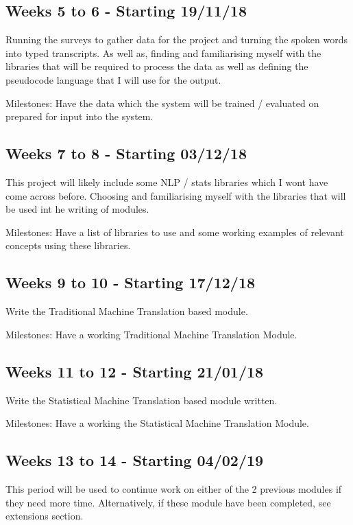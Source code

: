 \documentclass[12pt]{article}
\begin{document}
\subsection*{Weeks 5 to 6 - Starting 19/11/18}

Running the surveys to gather data for the project and turning the spoken words into typed
transcripts. As well as, finding and familiarising myself with the libraries that will be required to
process the data as well as defining the pseudocode language that I will use for the output. 

Milestones: Have the data which the system will be trained / evaluated on prepared for input into the system.

\subsection*{Weeks 7 to 8 - Starting 03/12/18}

This project will likely include some NLP / stats libraries which I wont have come across before. 
Choosing and familiarising myself with the libraries that will be used int he writing of modules.

Milestones: Have a list of libraries to use and some working examples of relevant concepts using these libraries.

\subsection*{Weeks 9 to 10 - Starting 17/12/18}

Write the Traditional Machine Translation based module.

Milestones: Have a working Traditional Machine Translation Module.

\subsection*{Weeks 11 to 12 - Starting 21/01/18}

Write the Statistical Machine Translation based module written.

Milestones: Have a working the Statistical Machine Translation Module.

\subsection*{Weeks 13 to 14 - Starting 04/02/19}

This period will be used to continue work on either of the 2 previous modules if they need more
time. Alternatively, if these module have been completed, see extensions section.
\end{document}
